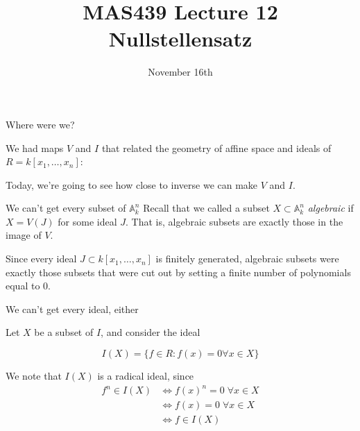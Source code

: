 \documentclass{beamer}
\title{MAS439 Lecture 12 \\ Nullstellensatz}
\date{November 16th}
\newcommand{\AAA}{\mathbb{A}}
\begin{document}
\begin{frame}
\titlepage
\end{frame}


\begin{frame}{Where were we?}

We had maps $V$ and $I$ that related the geometry of affine space and ideals of $R=k[x_1,\dots, x_n]$:

\begin{center}
\end{center}
Today, we're going to see how close to inverse we can make $V$ and $I$.

\end{frame}

\begin{frame}{We can't get every subset of $\AAA_k^n$}
Recall that we called a subset $X\subset \AAA_k^n$ \emph{algebraic} if $X=V(J)$ for some ideal $J$.  That is, algebraic subsets are exactly those in the image of $V$.


Since every ideal $J\subset k[x_1,\dots, x_n]$ is finitely generated, algebraic subsets were exactly those subsets that were cut out by setting a finite number of polynomials equal to 0.

\end{frame}



\begin{frame}{We can't get every ideal, either}

Let $X$ be a subset of $I$, and consider the ideal

$$I(X)=\{f\in R : f(x)=0 \forall x\in X\}$$

We note that $I(X)$ is a radical ideal, since
\begin{align*}
f^n\in I(X) & \iff f(x)^n=0\;\forall x\in X \\
&\iff f(x)=0\;\forall x \in X \\ 
& \iff f\in I(X) 
\end{align*}

\end{frame}
\end{document}
